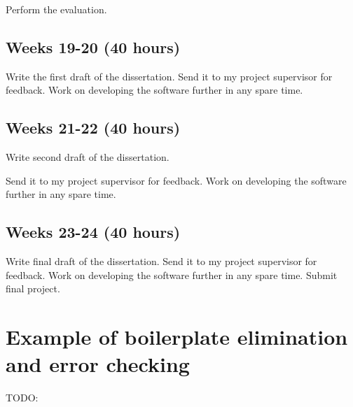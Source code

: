 \documentclass[11pt]{article}
\begin{document}
Perform the evaluation.

\subsection{Weeks 19-20 (40 hours)}

Write the first draft of the dissertation. Send it to my project supervisor for
feedback. Work on developing the software further in any spare time.

\subsection{Weeks 21-22 (40 hours)}

Write second draft of the dissertation.

Send it to my project supervisor for feedback. Work on developing the software
further in any spare time.


\subsection{Weeks 23-24 (40 hours)}

Write final draft of the dissertation. Send it to my project supervisor for
feedback. Work on developing the software further in any spare time. Submit
final project.

\section{Example of boilerplate elimination and error checking}

TODO:
\end{document}
